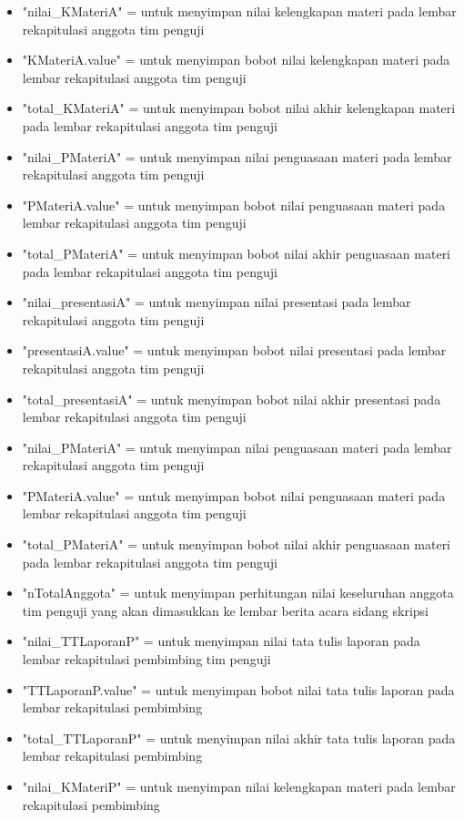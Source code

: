 \begin{itemize}
\begin{itemize}
			\item "nilai\_KMateriA" = untuk menyimpan nilai kelengkapan materi pada lembar rekapitulasi anggota tim penguji
			\item "KMateriA.value" = untuk menyimpan bobot nilai kelengkapan materi pada lembar rekapitulasi anggota tim penguji
			\item "total\_KMateriA" = untuk menyimpan bobot nilai akhir kelengkapan materi pada lembar rekapitulasi anggota tim penguji
			\item "nilai\_PMateriA" = untuk menyimpan nilai penguasaan materi pada lembar rekapitulasi anggota tim penguji
			\item "PMateriA.value" = untuk menyimpan bobot nilai penguasaan materi pada lembar rekapitulasi anggota tim penguji
			\item "total\_PMateriA" = untuk menyimpan bobot nilai akhir penguasaan materi pada lembar rekapitulasi anggota tim penguji
			\item "nilai\_presentasiA" = untuk menyimpan nilai presentasi pada lembar rekapitulasi anggota tim penguji
			\item "presentasiA.value" = untuk menyimpan bobot nilai presentasi pada lembar rekapitulasi anggota tim penguji
			\item "total\_presentasiA" = untuk menyimpan bobot nilai akhir presentasi pada lembar rekapitulasi anggota tim penguji
			\item "nilai\_PMateriA" = untuk menyimpan nilai penguasaan materi pada lembar rekapitulasi anggota tim penguji
			\item "PMateriA.value" = untuk menyimpan bobot nilai penguasaan materi pada lembar rekapitulasi anggota tim penguji
			\item "total\_PMateriA" = untuk menyimpan bobot nilai akhir penguasaan materi pada lembar rekapitulasi anggota tim penguji
			\item "nTotalAnggota" = untuk menyimpan perhitungan nilai keseluruhan anggota tim penguji yang akan dimasukkan ke lembar berita acara sidang skripsi
			\item "nilai\_TTLaporanP" = untuk menyimpan nilai tata tulis laporan pada lembar rekapitulasi pembimbing tim penguji
			\item "TTLaporanP.value" = untuk menyimpan bobot nilai tata tulis laporan pada lembar rekapitulasi pembimbing
			\item "total\_TTLaporanP" = untuk menyimpan nilai akhir tata tulis laporan pada lembar rekapitulasi pembimbing
			\item "nilai\_KMateriP" = untuk menyimpan nilai kelengkapan materi pada lembar rekapitulasi pembimbing

\end{itemize}
\end{itemize}
